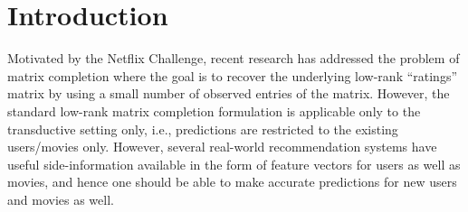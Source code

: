 \documentclass[11pt]{article}
\begin{document}
\begin{abstract}
In addition to inductive matrix completion, we show that two other low-rank estimation problems can be studied in our framework: a) general low-rank matrix sensing using rank-$1$ measurements, and b) multi-label regression with missing labels. For both the problems, we provide novel and interesting bounds on the number of measurements required by alternating minimization to provably converges to the {\em exact} low-rank matrix. %
In particular, our analysis for the general low rank matrix sensing problem significantly improves the required storage and computational cost  than that required by the RIP-based matrix sensing methods \cite{RechtFP2007}. Finally, we provide empirical validation of our approach and demonstrate that  alternating minimization is able to recover the true matrix for the above mentioned problems using a small number of measurements.%
\end{abstract}

\newcommand{\lrrom}{LRROM }
\section{Introduction}\label{sec:intro}
Motivated by the Netflix Challenge, recent research has addressed the problem of matrix completion where the goal is to recover the underlying low-rank ``ratings'' matrix by using a small number of observed entries of the matrix. However, the standard low-rank matrix completion formulation is applicable only to the transductive setting only, i.e., predictions are restricted to the existing users/movies only. However, several real-world recommendation systems have useful side-information available in the form of feature vectors for users as well as movies, and hence one should be able to make accurate predictions for new users and movies as well.%
\end{document}
